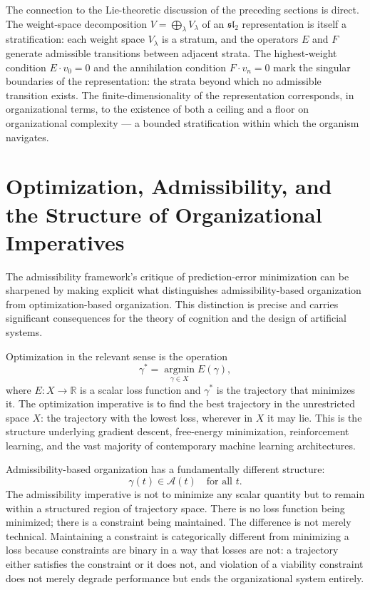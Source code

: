 \documentclass[12pt,a4paper]{report}
\theoremstyle{flyxion}
\begin{document}
The connection to the Lie-theoretic discussion of the preceding sections is direct. The weight-space decomposition $V = \bigoplus_\lambda V_\lambda$ of an $\mathfrak{sl}_2$ representation is itself a stratification: each weight space $V_\lambda$ is a stratum, and the operators $E$ and $F$ generate admissible transitions between adjacent strata. The highest-weight condition $E \cdot v_0 = 0$ and the annihilation condition $F \cdot v_n = 0$ mark the singular boundaries of the representation: the strata beyond which no admissible transition exists. The finite-dimensionality of the representation corresponds, in organizational terms, to the existence of both a ceiling and a floor on organizational complexity --- a bounded stratification within which the organism navigates.

\section{Optimization, Admissibility, and the Structure of Organizational Imperatives}

The admissibility framework's critique of prediction-error minimization can be sharpened by making explicit what distinguishes admissibility-based organization from optimization-based organization. This distinction is precise and carries significant consequences for the theory of cognition and the design of artificial systems.

Optimization in the relevant sense is the operation
\[
\gamma^* = \operatorname*{argmin}_{\gamma \in X} E(\gamma),
\]
where $E : X \rightarrow \mathbb{R}$ is a scalar loss function and $\gamma^*$ is the trajectory that minimizes it. The optimization imperative is to find the best trajectory in the unrestricted space $X$: the trajectory with the lowest loss, wherever in $X$ it may lie. This is the structure underlying gradient descent, free-energy minimization, reinforcement learning, and the vast majority of contemporary machine learning architectures.

Admissibility-based organization has a fundamentally different structure:
\[
\gamma(t) \in \mathcal{A}(t) \quad \text{for all } t.
\]
The admissibility imperative is not to minimize any scalar quantity but to remain within a structured region of trajectory space. There is no loss function being minimized; there is a constraint being maintained. The difference is not merely technical. Maintaining a constraint is categorically different from minimizing a loss because constraints are binary in a way that losses are not: a trajectory either satisfies the constraint or it does not, and violation of a viability constraint does not merely degrade performance but ends the organizational system entirely.
\end{document}
